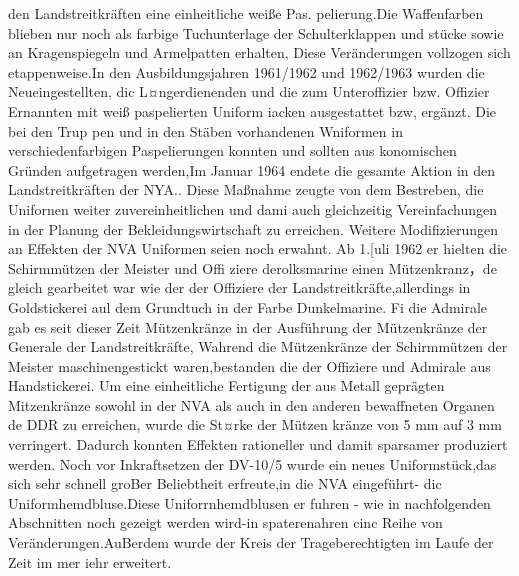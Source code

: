 den Landstreitkräften eine einheitliche weiße Pas.
pelierung.Die Waffenfarben blieben nur noch als
farbige Tuchunterlage der Schulterklappen und
stücke sowie an Kragenspiegeln und Armelpatten
erhalten, Diese Veränderungen vollzogen sich etappenweise.In den Ausbildungsjahren 1961/1962
und 1962/1963 wurden die Neueingestellten, dic
L¤ngerdienenden und die zum Unteroffizier bzw.
Offizier Ernannten mit weiß paspelierten Uniform
iacken ausgestattet bzw, ergänzt. Die bei den Trup
pen und in den Stäben vorhandenen Wniformen in
verschiedenfarbigen Paspelierungen konnten und
sollten aus konomischen Gründen aufgetragen
werden,Im Januar 1964 endete die gesamte Aktion
in den Landstreitkräften der NYA..
Diese Maßnahme zeugte von dem Bestreben, die
Unifornen weiter zuvereinheitlichen und dami
auch gleichzeitig Vereinfachungen in der Planung
der Bekleidungswirtschaft zu erreichen.
Weitere Modifizierungen an Effekten der NVA
Uniformen seien noch erwahnt. Ab 1.[uli 1962 er
hielten die Schirmmützen der Meister und Offi
ziere derolksmarine einen
Mützenkranz，de
gleich gearbeitet war wie der der Offiziere der
Landstreitkräfte,allerdings in Goldstickerei aul
dem Grundtuch in der Farbe Dunkelmarine. Fi
die Admirale gab es seit dieser Zeit Mützenkränze
in der Ausführung der Mützenkränze der Generale
der Landstreitkräfte, Wahrend die Mützenkränze
der Schirmmützen der Meister maschinengestickt
waren,bestanden die der Offiziere und Admirale
aus Handstickerei.
Um eine einheitliche Fertigung der aus Metall
geprägten Mitzenkränze sowohl in der NVA als
auch in den anderen bewaffneten Organen de
DDR zu erreichen, wurde die St¤rke der Mützen
kränze von 5 mm auf 3 mm verringert. Dadurch
konnten Effekten rationeller und damit sparsamer
produziert werden.
Noch vor Inkraftsetzen der DV-10/5 wurde ein
neues Uniformstück,das sich sehr schnell groBer
Beliebtheit erfreute,in die NVA eingeführt- dic
Uniformhemdbluse.Diese Uniforrnhemdblusen er
fuhren - wie in nachfolgenden Abschnitten noch
gezeigt werden wird-in spaterenahren cinc
Reihe von Veränderungen.AuBerdem wurde der
Kreis der Trageberechtigten im Laufe der Zeit im
mer iehr erweitert.